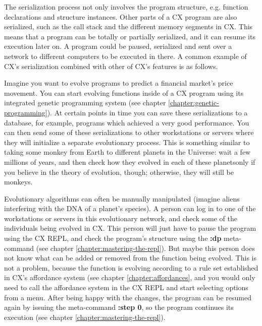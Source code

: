 \documentclass[11pt,fleqn,openany]{book} %
\begin{document}
The serialization process not only involves the program structure, e.g. function declarations and structure instances. Other parts of a CX program are also serialized, such as the call stack and the different memory segments in CX. This means that a program can be totally or partially serialized, and it can resume its execution later on. A program could be paused, serialized and sent over a network to different computers to be executed in there. A common example of CX's serialization combined with other of CX's features is as follows.

Imagine you want to evolve programs to predict a financial market's price movement. You can start evolving functions inside of a CX program using its integrated genetic programming system (see chapter \ref{chapter:genetic-programming}). At certain points in time you can save these serializations to a database, for example, programs which achieved a very good performance. You can then send some of these serializations to other workstations or servers where they will initialize a separate evolutionary process. This is something similar to taking some monkey from Earth to different planets in the Universe: wait a few millions of years, and then check how they evolved in each of these planets{only if you believe in the theory of evolution, though; otherwise, they will still be monkeys}.

Evolutionary algorithms can often be manually manipulated (imagine aliens interfering with the DNA of a planet's species). A person can log in to one of the workstations or servers in this evolutionary network, and check some of the individuals being evolved in CX. This person will just have to pause the program using the CX REPL, and check the program's structure using the \textbf{:dp} meta-command (see chapter \ref{chapter:mastering-the-repl}). But maybe this person does not know what can be added or removed from the function being evolved. This is not a problem, because the function is evolving according to a rule set established in CX's affordance system (see chapter \ref{chapter:affordances}, and you would only need to call the affordance system in the CX REPL and start selecting options from a menu. After being happy with the changes, the program can be resumed again by issuing the meta-command \textbf{:step 0}, so the program continues its execution (see chapter \ref{chapter:mastering-the-repl}).

\end{document}
